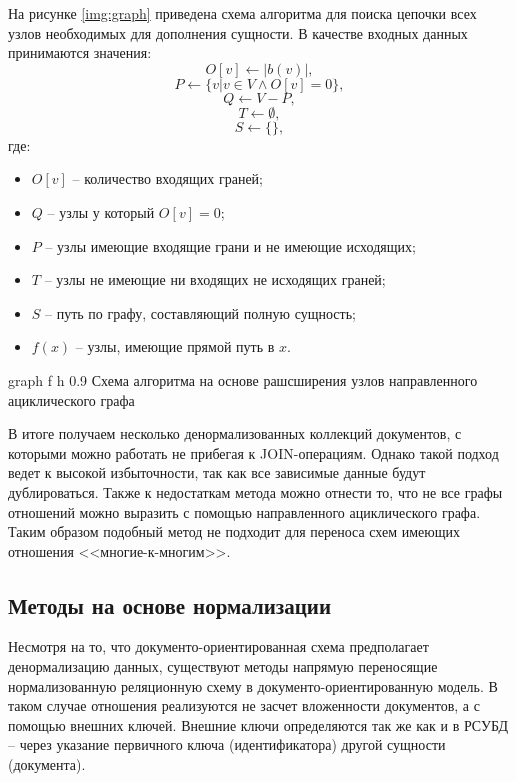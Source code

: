 На рисунке \ref{img:graph} приведена схема алгоритма для поиска цепочки всех узлов необходимых для дополнения сущности.
В качестве входных данных принимаются значения:
$$O[v] \leftarrow |b(v)|,$$
$$P \leftarrow  \{v | v \in V \wedge O[v] = 0\},$$
$$Q \leftarrow V - P,$$
$$T \leftarrow \emptyset,$$
$$ S \leftarrow \{\},$$
где:
\begin{itemize}[label=---]
    \item $O[v]$ -- количество входящих граней;
    \item $Q$ -- узлы у который $O[v] = 0$;
    \item $P$ -- узлы имеющие входящие грани и не имеющие исходящих;
    \item $T$ -- узлы не имеющие ни входящих не исходящих граней;
    \item $S$ -- путь по графу, составляющий полную сущность;
    \item $f(x)$ -- узлы, имеющие прямой путь в $x$.
\end{itemize}

\clearpage

    {graph} %
    {f} %
    {h} %
    {0.9\textwidth} %
    {Схема алгоритма на основе рашсширения узлов направленного ациклического графа} %
    
В итоге получаем несколько денормализованных коллекций документов, с которыми можно работать не прибегая к JOIN-операциям.
Однако такой подход ведет к высокой избыточности, так как все зависимые данные будут дублироваться.
Также к недостаткам метода можно отнести то, что не все графы отношений можно выразить с помощью направленного ациклического графа.
Таким образом подобный метод не подходит для переноса схем имеющих отношения <<многие-к-многим>>. 

\clearpage
\subsection{Методы на основе нормализации}
Несмотря на то, что документо-ориентированная схема предполагает денормализацию данных,
существуют методы напрямую переносящие нормализованную реляционную схему в документо-ориентированную модель.
В таком случае отношения реализуются не засчет вложенности документов, а с помощью внешних ключей.
Внешние ключи определяются так же как и в РСУБД -- через указание первичного ключа (идентификатора) другой сущности (документа).

